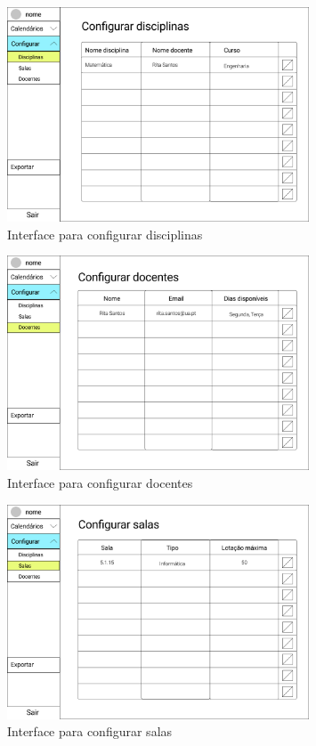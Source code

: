 \documentclass[11pt, twoside]{report}
\begin{document}
	\begin{figure}[H] 
		\centering 
		\includegraphics[width=0.8\textwidth,height=0.8\textheight,keepaspectratio]{image/prototipowireframes/configurardisciplinas}
		\caption{Interface para configurar disciplinas}
		\label{interfaceconfdisciplinas}
	\end{figure}

	
		\begin{figure}[H] 
		\centering 
		\includegraphics[width=0.8\textwidth,height=0.8\textheight,keepaspectratio]{image/prototipowireframes/configurardocentes}
		\caption{Interface para configurar docentes}
		\label{interfaceconfdocentes}
	\end{figure}
	
	\begin{figure}[H] 
		\centering 
		\includegraphics[width=0.8\textwidth,height=0.8\textheight,keepaspectratio]{image/prototipowireframes/configurarsalas}
		\caption{Interface para configurar salas}
		\label{interfaceconfsalas}
	\end{figure}
\end{document}
